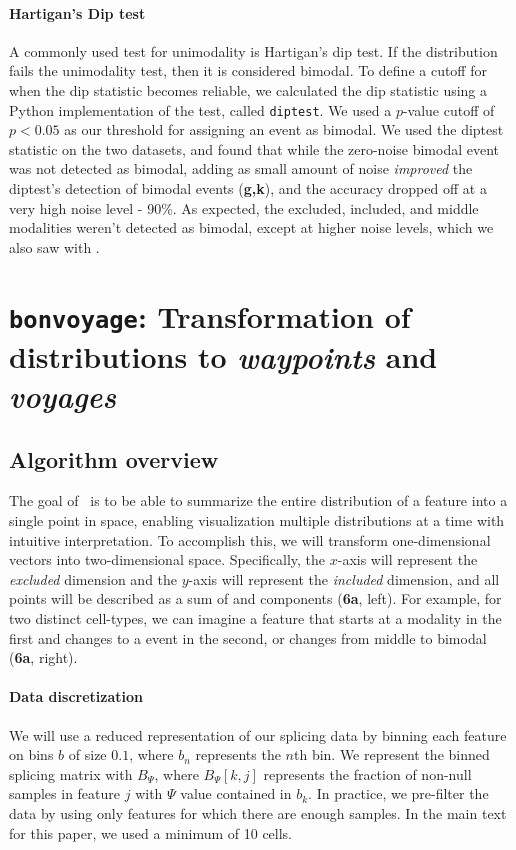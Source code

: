 \paragraph{Hartigan's Dip test}
A commonly used test for unimodality is Hartigan's dip test\cite{Hartigan:1985ca}. If the distribution fails the unimodality test, then it is considered bimodal. To define a cutoff for when the dip statistic becomes reliable, we calculated the dip statistic using a Python implementation of the test, called \texttt{diptest}\cite{Anonymous:zTNIPlgQ}. We used a $p$-value cutoff of $p <0.05$ as our threshold for assigning an event as bimodal. We used the diptest statistic on the two datasets, and found that while the zero-noise bimodal event was not detected as bimodal, adding as small amount of noise \emph{improved} the diptest's detection of bimodal events (\textbf{g,k}), and the accuracy dropped off at a very high noise level - 90\%. As expected, the excluded, included, and middle modalities weren't detected as bimodal, except at higher noise levels, which we also saw with \anchor.


\section{\texttt{bonvoyage}: Transformation of distributions to \emph{waypoints} and \emph{voyages}}
\label{sec:bonvoyage}

\subsection{Algorithm overview}

The goal of \bonvoyage\, is to be able to summarize the entire distribution of a feature into a single point in space, enabling visualization multiple distributions at a time with intuitive interpretation. To accomplish this, we will transform one-dimensional vectors into two-dimensional space. Specifically, the $x$-axis will represent the \emph{excluded} dimension and the $y$-axis will represent the \emph{included} dimension, and all points will be described as a sum of \0 and \1 components (\textbf{6a}, left). For example, for two distinct cell-types, we can imagine a feature that starts at a \1 modality in the first and changes to a \0 event in the second, or changes from middle to bimodal (\textbf{6a}, right).



\paragraph{Data discretization}
We will use a reduced representation of our splicing data by binning each feature on bins $b$ of size $0.1$, where $b_n$ represents the $n$th bin. We represent the binned splicing matrix with $B_\Psi$, where $B_\Psi[k,j]$ represents the fraction of non-null samples in feature $j$ with $\Psi$ value contained in $b_k$. In practice, we pre-filter the data by using only features for which there are enough samples. In the main text for this paper, we used a minimum of 10 cells.

